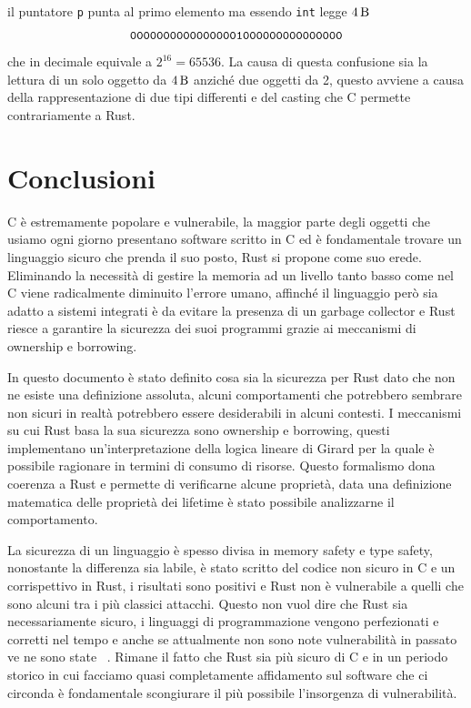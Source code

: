 \documentclass[Lau,binding=0.6cm]{sapthesis}
\newcommand{\textcode}[1]{\colorbox{backcolour}{\texttt{#1}}}
\begin{document}
il puntatore \texttt{p} punta al primo elemento ma essendo \textcode{int} legge $ \SI{4}{\byte} $  
\[
\texttt{00000000000000001000000000000000} \\
\]
che in decimale equivale a $ 2^{16} = 65536 $. La causa di questa confusione sia la lettura di un solo oggetto da $\SI{4}{\byte} $ anziché due oggetti da 2, questo avviene a causa della rappresentazione di due tipi differenti e del casting che C permette contrariamente a Rust.





\chapter{Conclusioni}
C è estremamente popolare e vulnerabile, la maggior parte degli oggetti che usiamo ogni giorno presentano software scritto in C ed è fondamentale trovare un linguaggio sicuro che prenda il suo posto, Rust si propone come suo erede.
Eliminando la necessità di gestire la memoria ad un livello tanto basso come nel C viene radicalmente diminuito l'errore umano, affinché il linguaggio però sia adatto a sistemi integrati è da evitare la presenza di un garbage collector e Rust riesce a garantire la sicurezza dei suoi programmi grazie ai meccanismi di ownership e borrowing. 

In questo documento è stato definito cosa sia la sicurezza per Rust dato che non ne esiste una definizione assoluta, alcuni comportamenti che potrebbero sembrare non sicuri in realtà potrebbero essere desiderabili in alcuni contesti.
I meccanismi su cui Rust basa la sua sicurezza sono ownership e borrowing, questi implementano un'interpretazione della logica lineare di Girard per la quale è possibile ragionare in termini di consumo di risorse.
Questo formalismo dona coerenza a Rust e permette di verificarne alcune proprietà, data una definizione matematica delle proprietà dei lifetime è stato possibile analizzarne il comportamento.

La sicurezza di un linguaggio è spesso divisa in memory safety e type safety, nonostante la differenza sia labile, è stato scritto del codice non sicuro in C e un corrispettivo in Rust, i risultati sono positivi e Rust non è vulnerabile a quelli che sono alcuni tra i più classici attacchi.
Questo non vuol dire che Rust sia necessariamente sicuro, i linguaggi di programmazione vengono perfezionati e corretti nel tempo e anche se attualmente non sono note vulnerabilità in passato ve ne sono state ~\cite{cve:rust}. 
Rimane il fatto che Rust sia più sicuro di C e in un periodo storico in cui facciamo quasi completamente affidamento sul software che ci circonda è fondamentale scongiurare il più possibile l'insorgenza di vulnerabilità. 
\end{document}
